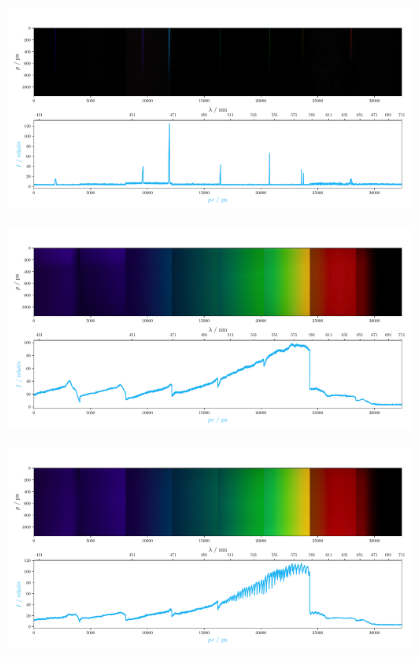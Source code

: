 \documentclass[12pt,english,ngerman]{scrartcl}
\begin{document}
\begin{figure}[H]
	\begin{center}
		\includegraphics[width=0.95\textwidth]{figures/Hg_plot.pdf}
	\end{center}
	\caption{}\label{fig:prismaHgSpektrum}
\end{figure}

\begin{figure}[H]
	\begin{center}
		\includegraphics[width=0.95\textwidth]{figures/Halo_plot.pdf}
	\end{center}
	\caption{}\label{fig:prismaHaloSpektrum}
\end{figure}

\begin{figure}[H]
	\begin{center}
		\includegraphics[width=0.95\textwidth]{figures/I_plot.pdf}
	\end{center}
	\caption{}\label{fig:prismaIodSpektrum}
\end{figure}
\end{document}
